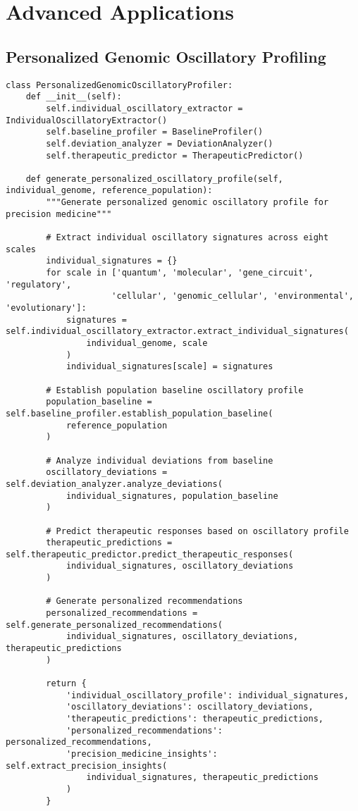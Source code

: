 \documentclass[12pt,a4paper]{article}
\begin{document}
\section{Advanced Applications}

\subsection{Personalized Genomic Oscillatory Profiling}

\begin{lstlisting}[style=pythonstyle, caption=Personalized Genomic Oscillatory Profile Generation]
class PersonalizedGenomicOscillatoryProfiler:
    def __init__(self):
        self.individual_oscillatory_extractor = IndividualOscillatoryExtractor()
        self.baseline_profiler = BaselineProfiler()
        self.deviation_analyzer = DeviationAnalyzer()
        self.therapeutic_predictor = TherapeuticPredictor()
        
    def generate_personalized_oscillatory_profile(self, individual_genome, reference_population):
        """Generate personalized genomic oscillatory profile for precision medicine"""
        
        # Extract individual oscillatory signatures across eight scales
        individual_signatures = {}
        for scale in ['quantum', 'molecular', 'gene_circuit', 'regulatory', 
                     'cellular', 'genomic_cellular', 'environmental', 'evolutionary']:
            signatures = self.individual_oscillatory_extractor.extract_individual_signatures(
                individual_genome, scale
            )
            individual_signatures[scale] = signatures
        
        # Establish population baseline oscillatory profile
        population_baseline = self.baseline_profiler.establish_population_baseline(
            reference_population
        )
        
        # Analyze individual deviations from baseline
        oscillatory_deviations = self.deviation_analyzer.analyze_deviations(
            individual_signatures, population_baseline
        )
        
        # Predict therapeutic responses based on oscillatory profile
        therapeutic_predictions = self.therapeutic_predictor.predict_therapeutic_responses(
            individual_signatures, oscillatory_deviations
        )
        
        # Generate personalized recommendations
        personalized_recommendations = self.generate_personalized_recommendations(
            individual_signatures, oscillatory_deviations, therapeutic_predictions
        )
        
        return {
            'individual_oscillatory_profile': individual_signatures,
            'oscillatory_deviations': oscillatory_deviations,
            'therapeutic_predictions': therapeutic_predictions,
            'personalized_recommendations': personalized_recommendations,
            'precision_medicine_insights': self.extract_precision_insights(
                individual_signatures, therapeutic_predictions
            )
        }
\end{lstlisting}
\end{document}

